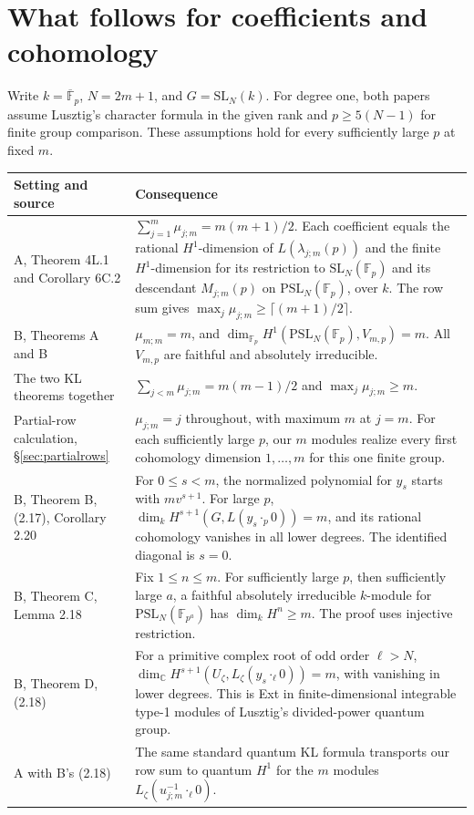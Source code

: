 \newpage\section{What follows for coefficients and cohomology}

Write \(k=\overline{\mathbb F}_p\), \(N=2m+1\), and \(G=\mathrm{SL}_N(k)\).
For degree one, both papers assume Lusztig's character formula in the
given rank and \(p\ge5(N-1)\) for finite group comparison. These assumptions
hold for every sufficiently large \(p\) at fixed \(m\).

\begingroup\small\renewcommand{\arraystretch}{1.17}
\begin{tabularx}{\linewidth}{@{}>{\raggedright\arraybackslash}p{.215\linewidth}Y@{}}
\toprule
Setting and source & Consequence \\ \midrule
A, Theorem 4L.1 and Corollary 6C.2 &
\(\sum_{j=1}^m\mu_{j;m}=m(m+1)/2\).
Each coefficient equals the rational \(H^1\)-dimension of
\(L(\lambda_{j;m}(p))\) and the finite \(H^1\)-dimension for its restriction
to \(\mathrm{SL}_N(\mathbb F_p)\) and its descendant \(M_{j;m}(p)\)
on \(\mathrm{PSL}_N(\mathbb F_p)\), over \(k\).
The row sum gives \(\max_j\mu_{j;m}\ge\lceil(m+1)/2\rceil\).\\
B, Theorems A and B &
\(\mu_{m;m}=m\), and
\(\dim_{\mathbb F_p}H^1(\mathrm{PSL}_N(\mathbb F_p),V_{m,p})=m\).
All \(V_{m,p}\) are faithful and absolutely irreducible.\\
The two KL theorems together &
\(\sum_{j<m}\mu_{j;m}=m(m-1)/2\) and \(\max_j\mu_{j;m}\ge m\).\\
Partial-row calculation, \S\ref{sec:partialrows} &
$\mu_{j;m}=j$ throughout, with maximum $m$ at $j=m$. For each sufficiently large $p$, our $m$ modules realize every first cohomology dimension $1,\ldots,m$ for this one finite group.\\
B, Theorem B, (2.17), Corollary 2.20 &
For \(0\le s<m\), the normalized polynomial for \(y_s\) starts with
\(mv^{s+1}\). For large \(p\),
\(\dim_k H^{s+1}(G,L(y_s\cdot_p0))=m\), and its rational
cohomology vanishes in all lower degrees. The identified diagonal is \(s=0\).\\
B, Theorem C, Lemma 2.18 &
Fix \(1\le n\le m\). For sufficiently large \(p\), then sufficiently
large \(a\), a faithful absolutely irreducible \(k\)-module for
\(\mathrm{PSL}_N(\mathbb F_{p^a})\) has \(\dim_kH^n\ge m\).
The proof uses injective restriction.\\
B, Theorem D, (2.18) &
For a primitive complex root of odd order \(\ell>N\),
\(\dim_{\mathbb C}H^{s+1}(U_\zeta,L_\zeta(y_s\cdot_\ell0))=m\),
with vanishing in lower degrees. This is Ext in finite-dimensional
integrable type-1 modules of Lusztig's divided-power quantum group.\\
A with B's (2.18) &
The same standard quantum KL formula transports our row sum to quantum
\(H^1\) for the \(m\) modules \(L_\zeta(u_{j;m}^{-1}\cdot_\ell0)\).\\
\bottomrule
\end{tabularx}\endgroup

